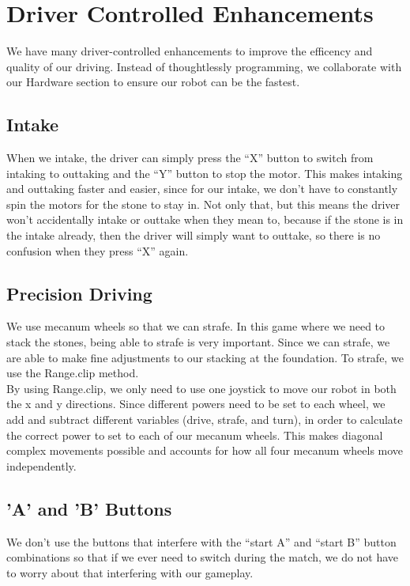 \documentclass{article}[12pt]
\begin{document}
\section{Driver Controlled Enhancements}

We have many driver-controlled enhancements to improve the efficency and quality of our driving. Instead of thoughtlessly programming, we collaborate with our Hardware section to ensure our robot can be the fastest.  

\subsection{Intake}
When we intake, the driver can simply press the “X” button to switch from intaking to outtaking and the “Y” button to stop the motor. This makes intaking and outtaking faster and easier, since for our intake, we don’t have to constantly spin the motors for the stone to stay in. Not only that, but this means the driver won’t accidentally intake or outtake when they mean to, because if the stone is in the intake already, then the driver will simply want to outtake, so there is no confusion when they press “X” again.


\subsection{Precision Driving}

We use mecanum wheels so that we can strafe. In this game where we need to stack the stones, being able to strafe is very important. Since we can strafe, we are able to make fine adjustments to our stacking at the foundation. To strafe, we use the Range.clip method. \\

By using Range.clip, we only need to use one joystick to move our robot in both the x and y directions. Since different powers need to be set to each wheel, we add and subtract different variables (drive, strafe, and turn), in order to calculate the correct power to set to each of our mecanum wheels. This makes diagonal complex movements possible and accounts for how all four mecanum wheels move independently.


\subsection{'A' and 'B' Buttons}

We don't use the buttons that interfere with the “start A” and “start B” button combinations so that if we ever need to switch during the match, we do not have to worry about that interfering with our gameplay.
\end{document}

